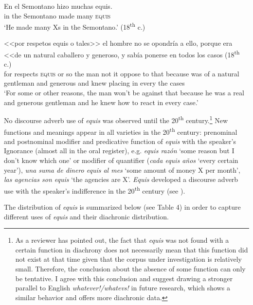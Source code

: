 \documentclass[output=paper
,modfonts
,nonflat]{langsci/langscibook}
\begin{document}
\ea
\gll En el Semontano hizo muchas equis.\\
in the Semontano made many \textsc{equis}\\
\glt ‘He made many Xs in the Semontano.’ (18\textsuperscript{th} c.)
\z

\ea
\gll <<por respetos equis o tales>> el hombre no se	opondría a ello, porque era <<de un natural caballero y generoso, y sabía ponerse en todos los casos (18\textsuperscript{th} c.)\\
for respects \textsc{equis} or so the man not it oppose to that because was of a natural gentleman and generous and knew placing in every the cases\\
\glt ‘For some or other reasons, the man won’t be against that because he was a real and generous gentleman and he knew how to react in every case.’
\z

No discourse adverb use of \textit{equis} was observed until the 20\textsuperscript{th} century.\footnote{As a reviewer has pointed out, the fact that \textit{equis} was not found with a certain function in diachrony does not necessarily mean that this function did not exist at that time given that the corpus under investigation is relatively small. Therefore, the conclusion about the absence of some function can only be tentative. I agree with this conclusion and suggest drawing a stronger parallel to English \textit{whatever!/whatevs!} in future research, which shows a similar behavior and offers more diachronic data.}
New functions and meanings appear in all varieties in the 20\textsuperscript{th} century: prenominal and postnominal modifier and predicative function of \textit{equis} with the speaker’s Ignorance (almost all in the oral register), e.g. \textit{equis razón} ‘some reason but I don’t know which one’ or modifier of quantifier (\textit{cada equis años} ‘every certain year’), \textit{una suma de dinero equis al mes} ‘some amount of money X per month’, \textit{las agencias son equis} ‘the agencies are X’. \textit{Equis} developed a discourse adverb use with the speaker’s indifference in the 20\textsuperscript{th} century (see ).

The distribution of \textit{equis} is summarized below (see Table 4) in order to capture different uses of \textit{equis} and their diachronic distribution.
\end{document}
